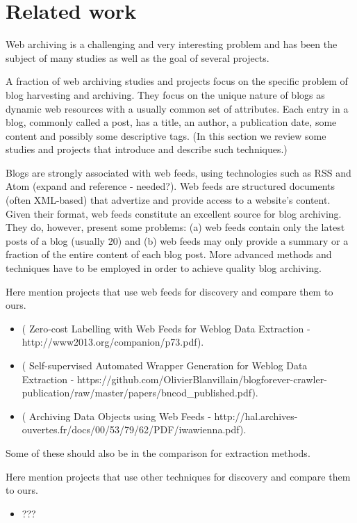 \section{Related work}

Web archiving is a challenging and very interesting problem and has been the subject of many studies as well as the goal of several projects.

A fraction of web archiving studies and projects focus on the specific problem of blog harvesting and archiving.
They focus on the unique nature of blogs as dynamic web resources with a usually common set of attributes.
Each entry in a blog, commonly called a post, has a title, an author, a publication date, some content and possibly some descriptive tags.
(In this section we review some studies and projects that introduce and describe such techniques.)

Blogs are strongly associated with web feeds, using technologies such as RSS and Atom (expand and reference - needed?).
Web feeds are structured documents (often XML-based) that advertize and provide access to a website's content.
Given their format, web feeds constitute an excellent source for blog archiving.
They do, however, present some problems: (a) web feeds contain only the latest posts of a blog (usually 20) and (b) web feeds may only provide a summary or a fraction of the entire content of each blog post.
More advanced methods and techniques have to be employed in order to achieve quality blog archiving.

Here mention projects that use web feeds for discovery and compare them to ours.
\begin{itemize}
  \item ( Zero-cost Labelling with Web Feeds for Weblog Data Extraction - http://www2013.org/companion/p73.pdf).
  \item ( Self-supervised Automated Wrapper Generation for Weblog Data Extraction - https://github.com/OlivierBlanvillain/blogforever-crawler-publication/raw/master/papers/bncod\_published.pdf).
  \item ( Archiving Data Objects using Web Feeds - http://hal.archives-ouvertes.fr/docs/00/53/79/62/PDF/iwawienna.pdf).
\end{itemize}
Some of these should also be in the comparison for extraction methods.

Here mention projects that use other techniques for discovery and compare them to ours.
\begin{itemize}
  \item ???
\end{itemize}

